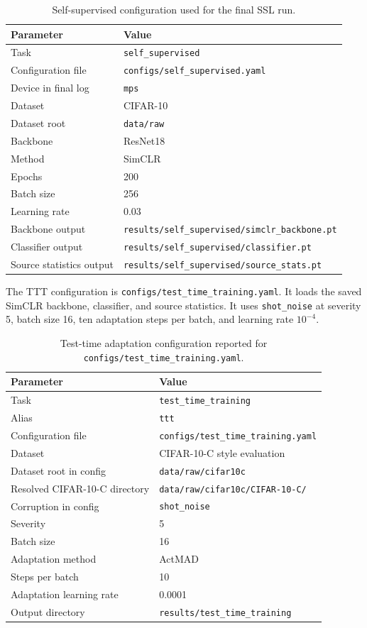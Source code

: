 \documentclass[a4paper,11pt]{article}
\begin{document}
\begin{table}[H]
\centering
\caption{Self-supervised configuration used for the final SSL run.}
\begin{tabular}{ll}
\toprule
Parameter & Value\\
\midrule
Task & \texttt{self\_supervised}\\
Configuration file & \texttt{configs/self\_supervised.yaml}\\
Device in final log & \texttt{mps}\\
Dataset & CIFAR-10\\
Dataset root & \texttt{data/raw}\\
Backbone & ResNet18\\
Method & SimCLR\\
Epochs & 200\\
Batch size & 256\\
Learning rate & 0.03\\
Backbone output & \texttt{results/self\_supervised/simclr\_backbone.pt}\\
Classifier output & \texttt{results/self\_supervised/classifier.pt}\\
Source statistics output & \texttt{results/self\_supervised/source\_stats.pt}\\
\bottomrule
\end{tabular}
\end{table}

The TTT configuration is \texttt{configs/test\_time\_training.yaml}. It loads the saved SimCLR backbone, classifier, and source statistics. It uses \texttt{shot\_noise} at severity 5, batch size 16, ten adaptation steps per batch, and learning rate \(10^{-4}\).

\begin{table}[H]
\centering
\caption{Test-time adaptation configuration reported for \texttt{configs/test\_time\_training.yaml}.}
\begin{tabular}{ll}
\toprule
Parameter & Value\\
\midrule
Task & \texttt{test\_time\_training}\\
Alias & \texttt{ttt}\\
Configuration file & \texttt{configs/test\_time\_training.yaml}\\
Dataset & CIFAR-10-C style evaluation\\
Dataset root in config & \texttt{data/raw/cifar10c}\\
Resolved CIFAR-10-C directory & \texttt{data/raw/cifar10c/CIFAR-10-C/}\\
Corruption in config & \texttt{shot\_noise}\\
Severity & 5\\
Batch size & 16\\
Adaptation method & ActMAD\\
Steps per batch & 10\\
Adaptation learning rate & 0.0001\\
Output directory & \texttt{results/test\_time\_training}\\
\bottomrule
\end{tabular}
\end{table}
\end{document}
